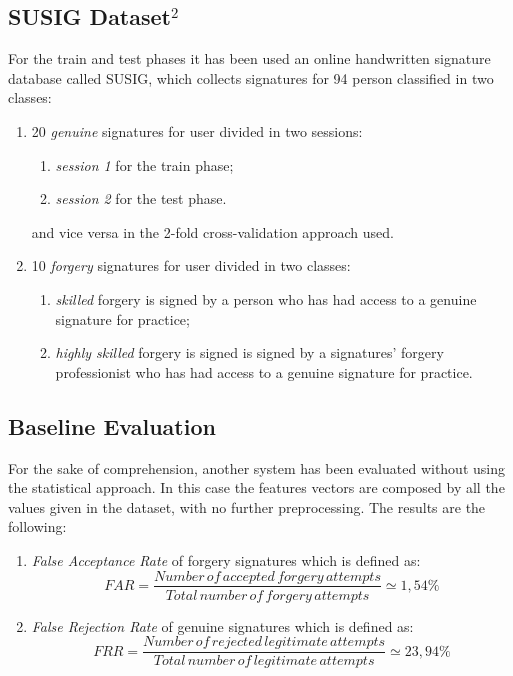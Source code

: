 \documentclass[a4paper, 10pt, conference]{IEEEconf}
\begin{document}
\subsection{SUSIG Dataset$^{2}$}
For the train and test phases it has been used an online handwritten signature database called SUSIG, which collects signatures for 94 person classified in two classes: 
	\begin{enumerate}[label=(\roman*)]
		\item 
			20 \textit{genuine} signatures for user divided in two sessions:
    	\begin{enumerate}[label=(\roman*)] 
        	\item 
        		\textit{session 1} for the train phase;
        	\item 
        		\textit{session 2} for the test phase.
    	\end{enumerate}
    	and vice versa in the 2-fold cross-validation approach used.
     	\item 
     		10 \textit{forgery} signatures for user divided in two classes:
    	\begin{enumerate}[label=(\roman*)]
       		\item 
       			\textit{skilled} forgery is signed by a person who has had access to a genuine signature for practice;
        	\item 
        		\textit{highly skilled} forgery is signed is signed by a signatures' forgery professionist who has had access to a genuine signature for practice.
    	\end{enumerate}
	\end{enumerate}

\subsection{Baseline Evaluation}
For the sake of comprehension, another system has been evaluated without using the statistical approach. In this case the features vectors are composed by all the values given in the dataset, with no further preprocessing. The results are the following:
	\begin{enumerate}[label=(\roman*)]
    	\item 
    		\textit{False Acceptance Rate} of forgery signatures which is defined as: \newline
\[ FAR = \frac{Number\,of\,accepted\,forgery\,attempts}{Total\,number\,of\,forgery\,attempts} \simeq 1,54\% \]
      	\item 
      		\textit{False Rejection Rate} of genuine signatures which is defined as: \newline
\[ FRR = \frac{Number\,of\,rejected\,legitimate\,attempts}{Total\,number\,of\,legitimate\,attempts} \simeq 23,94\% \]
    \end{enumerate}
\end{document}
